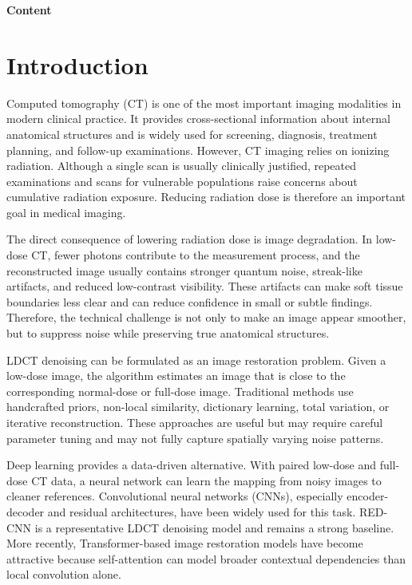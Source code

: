 \documentclass[12pt,a4paper]{report}
\begin{document}
\clearpage
\begin{center}
{\bfseries\fontsize{24}{28}\selectfont Content}
\end{center}
\renewcommand{\contentsname}{}
\tableofcontents

\clearpage
\setcounter{page}{1}

\chapter{Introduction}

Computed tomography (CT) is one of the most important imaging modalities in modern clinical practice. It provides cross-sectional information about internal anatomical structures and is widely used for screening, diagnosis, treatment planning, and follow-up examinations. However, CT imaging relies on ionizing radiation. Although a single scan is usually clinically justified, repeated examinations and scans for vulnerable populations raise concerns about cumulative radiation exposure. Reducing radiation dose is therefore an important goal in medical imaging.

The direct consequence of lowering radiation dose is image degradation. In low-dose CT, fewer photons contribute to the measurement process, and the reconstructed image usually contains stronger quantum noise, streak-like artifacts, and reduced low-contrast visibility. These artifacts can make soft tissue boundaries less clear and can reduce confidence in small or subtle findings. Therefore, the technical challenge is not only to make an image appear smoother, but to suppress noise while preserving true anatomical structures.

LDCT denoising can be formulated as an image restoration problem. Given a low-dose image, the algorithm estimates an image that is close to the corresponding normal-dose or full-dose image. Traditional methods use handcrafted priors, non-local similarity, dictionary learning, total variation, or iterative reconstruction. These approaches are useful but may require careful parameter tuning and may not fully capture spatially varying noise patterns.

Deep learning provides a data-driven alternative. With paired low-dose and full-dose CT data, a neural network can learn the mapping from noisy images to cleaner references. Convolutional neural networks (CNNs), especially encoder-decoder and residual architectures, have been widely used for this task. RED-CNN is a representative LDCT denoising model and remains a strong baseline. More recently, Transformer-based image restoration models have become attractive because self-attention can model broader contextual dependencies than local convolution alone.
\end{document}
